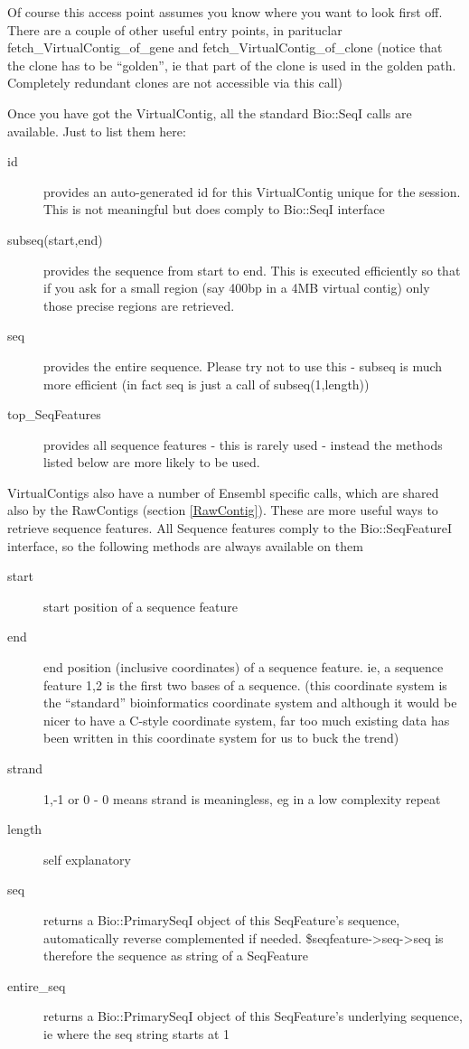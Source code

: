 \documentclass[11pt,a4paper]{article}
\begin{document}
Of course this access point assumes you know where you want to look
first off. There are a couple of other useful entry points, in
parituclar fetch\_VirtualContig\_of\_gene and
fetch\_VirtualContig\_of\_clone (notice that the clone has to be
``golden'', ie that part of the clone is used in the golden
path. Completely redundant clones are not accessible via this call)


Once you have got the VirtualContig, all the standard Bio::SeqI calls are available.
Just to list them here:

\begin{description}
\item[id] provides an auto-generated id for this VirtualContig unique
for the session. This is not meaningful but does comply to Bio::SeqI interface
\item[subseq(start,end)] provides the sequence from start to end. This is executed
efficiently so that if you ask for a small region (say 400bp in a 4MB virtual contig)
only those precise regions are retrieved.
\item[seq] provides the entire sequence. Please try not to use this - subseq is much more
efficient (in fact seq is just a call of subseq(1,length))
\item[top\_SeqFeatures] provides all sequence features - this is rarely used - instead the
methods listed below are more likely to be used.
\end{description}

VirtualContigs also have a number of Ensembl specific calls, which are
shared also by the RawContigs (section \ref{RawContig}). These are
more useful ways to retrieve sequence features. All Sequence features
comply to the Bio::SeqFeatureI interface, so the following methods are
always available on them

\begin{description}
\item[start] start position of a sequence feature
\item[end] end position (inclusive coordinates) of a sequence
feature. ie, a sequence feature 1,2 is the first two bases of a
sequence. (this coordinate system is the ``standard'' bioinformatics coordinate system
and although it would be nicer to have a C-style coordinate system, far too much existing data
has been written in this coordinate system for us to buck the trend)
\item[strand] 1,-1 or 0 - 0 means strand is meaningless, eg in a low complexity repeat
\item[length] self explanatory
\item[seq] returns a Bio::PrimarySeqI object of this SeqFeature's sequence, automatically reverse complemented if
needed. \$seqfeature->seq->seq is therefore the sequence as string of a SeqFeature
\item[entire\_seq] returns a Bio::PrimarySeqI object of this SeqFeature's underlying sequence, ie where the
seq string starts at 1
\end{description}
 
\end{document}
